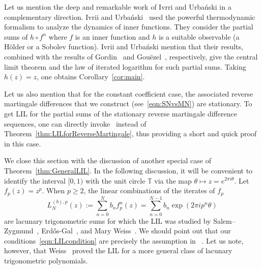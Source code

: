 \documentclass[12pt, reqno, final, a4paper]{amsart}
\theoremstyle{plain}
\theoremstyle{definition}
\theoremstyle{remark}
\DeclareMathOperator{\Ree}{Re}
\newcommand{\T}{\mathbb T}
\newcommand{\1}{\mathbf 1}
\begin{document}
Let us mention the deep and remarkable work of Ivrri and Urba\'nski in a complementary direction. Ivrii and Urba\'nski~\cite{IvriiUrbanski2023} used the powerful thermodynamic formalism to analyze the dynamics of inner functions. They consider the partial sums of $h\circ f^n$ where $f$ is an inner function and $h$ is a suitable observable (a H\"older or a Sobolev function). Ivrii and Urba\'nski mention that their results, combined with the results of Gordin~\cite{Gor69} and Gou\"ezel~\cite{Gou10}, respectively, give the central limit theorem and the law of iterated logarithm for such partial sums. Taking $h(z)=z$, one obtains Corollary~\ref{cor:main}. 

Let us also mention that for the constant coefficient case, the associated reverse martingale differences that we construct (see~\eqref{eqn:SNvsMN}) are stationary. To get LIL for the partial sums of the stationary reverse martingale difference sequences, one can directly invoke~\cite{CunyMerlevede2015} instead of Theorem~\ref{thm:LILforReverseMartingale}, thus providing a short and quick proof in this case. 

We close this section with the discussion of another special case of Theorem~\ref{thm:GeneralLIL}. In the following discussion, it will be convenient to identify the interval $[0, 1)$ with the unit circle $\T$ via the map $\theta\mapsto z=e^{2\pi i\theta}$.  Let $f_p(z)=z^p$. When $p\geq 2$, the linear combinations of the iterates of $f_p$ 
\[L_N^{(b), p}(z):=\sum_{n=0}^{N}b_nf^{n}_p(z) = \sum_{n=0}^{N-1}b_n\exp(2\pi i p^n \theta)\]
are lacunary trigonometric sums for which the LIL was studied by Salem--Zygmund~\cite{SalemZygmund1950}, Erd\H{o}s-Gal~\cite{ErdosGal1955}, and Mary Weiss~\cite{Weiss1959}. We should point out that our conditions~\eqref{eqn:LILcondition} are precisely the assumption in ~\cite[Equation (1.2)]{Weiss1959}. Let us note, however, that Weiss~\cite{Weiss1959} proved the LIL for a more general class of lacunary trigonometric polynomials.


\end{document}
